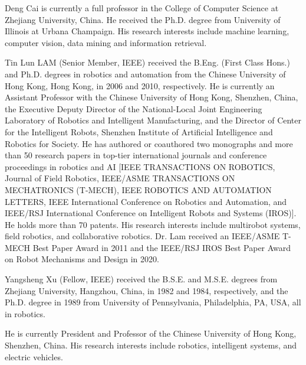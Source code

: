 \documentclass[lettersize,journal]{IEEEtran}
\begin{document}
\begin{IEEEbiography}
	{Deng Cai}
is currently a full professor in the College
of Computer Science at Zhejiang University, China.
He received the Ph.D. degree from University of
Illinois at Urbana Champaign. His research interests
include machine learning, computer vision, data
mining and information retrieval.
\end{IEEEbiography}
\begin{IEEEbiography}
	{Tin Lun LAM (Senior Member, IEEE)}
received the B.Eng. (First Class Hons.) and Ph.D. degrees in robotics and automation from the Chinese University of Hong Kong, Hong Kong, in 2006 and 2010, respectively. 
He is currently an Assistant Professor with the Chinese University of Hong Kong, Shenzhen, China, the Executive Deputy Director of the National-Local Joint Engineering Laboratory of Robotics and Intelligent Manufacturing, and the Director of Center for the Intelligent Robots, Shenzhen Institute of Artificial Intelligence and Robotics for Society. He has authored or coauthored two monographs and more than 50 research papers in top-tier international journals and conference proceedings in robotics and AI [IEEE TRANSACTIONS ON ROBOTICS, Journal of Field Robotics, IEEE/ASME TRANSACTIONS ON MECHATRONICS (T-MECH), IEEE ROBOTICS AND AUTOMATION LETTERS, IEEE International Conference on Robotics and Automation, and IEEE/RSJ International Conference on Intelligent Robots and Systems (IROS)]. He holds more than 70 patents. His research interests include multirobot systems, field robotics, and collaborative robotics. 
Dr. Lam received an IEEE/ASME T-MECH Best Paper Award in 2011 and the IEEE/RSJ IROS Best Paper Award on Robot Mechanisms and Design in 2020.
\end{IEEEbiography}
\begin{IEEEbiography}
	{Yangsheng Xu (Fellow, IEEE)}
received the B.S.E. and M.S.E.
degrees from Zhejiang University, Hangzhou, China,
in 1982 and 1984, respectively, and the Ph.D. degree
in 1989 from University of Pennsylvania, Philadelphia, PA, USA, all in robotics. 

He is currently President and Professor of the Chinese University of Hong Kong, Shenzhen, China. His research interests include robotics, intelligent systems, and electric vehicles.
\end{IEEEbiography}
\end{document}
